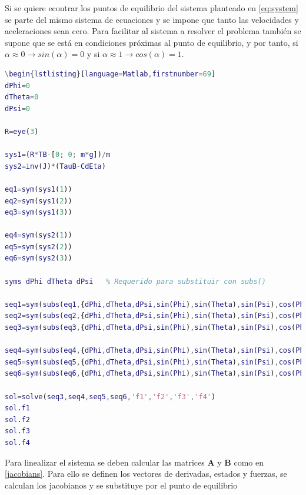 \documentclass[twoside,11pt]{book}
\begin{document}
Si se quiere econtrar los puntos de equilibrio del sistema planteado en \ref{eq:system} se parte del mismo sistema de ecuaciones y se impone que tanto las velocidades y aceleraciones sean cero. 
Para facilitar al sistema a resolver el problema también se supone que se está en condiciones próximas al punto de equilibrio, y por tanto, si  $\alpha \approx 0 \rightarrow sin(\alpha)=0$ y si $\alpha \approx 1 \rightarrow cos(\alpha)=1$.
\singlespacing
\begin{lstlisting}[language=Matlab,firstnumber=68]
\begin{lstlisting}[language=Matlab,firstnumber=69]
dPhi=0
dTheta=0
dPsi=0

R=eye(3)

sys1=(R*TB-[0; 0; m*g])/m
sys2=inv(J)*(TauB-CdEta)

eq1=sym(sys1(1))
eq2=sym(sys1(2))
eq3=sym(sys1(3))

eq4=sym(sys2(1))
eq5=sym(sys2(2))
eq6=sym(sys2(3))

syms dPhi dTheta dPsi 	% Requerido para substituir con subs()

seq1=sym(subs(eq1,{dPhi,dTheta,dPsi,sin(Phi),sin(Theta),sin(Psi),cos(Phi),cos(Theta),cos(Psi)},{0,0,0,0,0,0,1,1,1}))
seq2=sym(subs(eq2,{dPhi,dTheta,dPsi,sin(Phi),sin(Theta),sin(Psi),cos(Phi),cos(Theta),cos(Psi)},{0,0,0,0,0,0,1,1,1}))
seq3=sym(subs(eq3,{dPhi,dTheta,dPsi,sin(Phi),sin(Theta),sin(Psi),cos(Phi),cos(Theta),cos(Psi)},{0,0,0,0,0,0,1,1,1}))

seq4=sym(subs(eq4,{dPhi,dTheta,dPsi,sin(Phi),sin(Theta),sin(Psi),cos(Phi),cos(Theta),cos(Psi)},{0,0,0,0,0,0,1,1,1}))
seq5=sym(subs(eq5,{dPhi,dTheta,dPsi,sin(Phi),sin(Theta),sin(Psi),cos(Phi),cos(Theta),cos(Psi)},{0,0,0,0,0,0,1,1,1}))
seq6=sym(subs(eq6,{dPhi,dTheta,dPsi,sin(Phi),sin(Theta),sin(Psi),cos(Phi),cos(Theta),cos(Psi)},{0,0,0,0,0,0,1,1,1}))

sol=solve(seq3,seq4,seq5,seq6,'f1','f2','f3','f4')
sol.f1
sol.f2
sol.f3
sol.f4
\end{lstlisting}
\onehalfspacing

Para linealizar el sistema se deben calcular las matrices $\mathbf{A}$ y $\mathbf{B}$ como en  \ref{jacobians}. Para ello se definen los vectores de derivadas, estados y fuerzas, se calculan los jacobianos y se substituye por el punto de equilibrio
\end{document}
